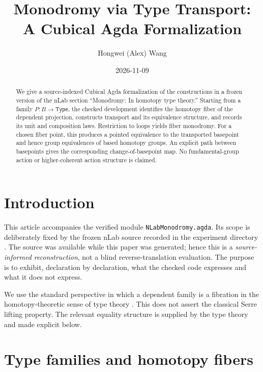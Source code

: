 \documentclass[11pt,reqno]{amsart}
\title[Monodromy via Type Transport]{Monodromy via Type Transport:\\A Cubical Agda Formalization}
\author{Hongwei (Alex) Wang}
\date{2026-11-09}
\theoremstyle{mytheorem}
\theoremstyle{mydefinition}
\newcommand{\Type}{\mathsf{Type}}
\newcommand{\ag}[1]{\texttt{#1}}
\begin{document}
\begin{abstract}
We give a source-indexed Cubical Agda formalization of the constructions in a
frozen version of the nLab section ``Monodromy: In homotopy type theory.''
Starting from a family $P:B\to\Type$, the checked development identifies the
homotopy fiber of the dependent projection, constructs transport and its
equivalence structure, and records its unit and composition laws.  Restriction
to loops yields fiber monodromy.  For a chosen fiber point, this produces a
pointed equivalence to the transported basepoint and hence group equivalences
of based homotopy groups.  An explicit path between basepoints gives the
corresponding change-of-basepoint map.  No fundamental-group action or
higher-coherent action structure is claimed.
\end{abstract}
\maketitle

\section{Introduction}

This article accompanies the verified module \ag{NLabMonodromy.agda}.  Its
scope is deliberately fixed by the frozen nLab source recorded in the
experiment directory \cite{nlab}.  The source was available while this paper
was generated; hence this is a \emph{source-informed reconstruction}, not a
blind reverse-translation evaluation.  The purpose is to exhibit, declaration
by declaration, what the checked code expresses and what it does not express.

We use the standard perspective in which a dependent family is a fibration in
the homotopy-theoretic sense of type theory \cite[\S2.3]{hott}.  This does not
assert the classical Serre lifting property.  The relevant equality structure
is supplied by the type theory and made explicit below.

\section{Type families and homotopy fibers}
\end{document}
